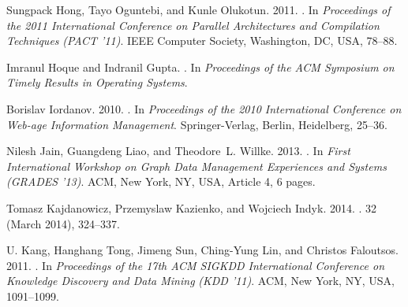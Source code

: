 \documentclass[reprint,twocolumn,showpacs,preprintnumbers,amsmath, aps,pre,amssymb]{revtex4-1}
\begin{document}
\begin{thebibliography}{00}
{
{Sungpack Hong}, {Tayo Oguntebi}, {and} {Kunle Olukotun}. 2011.
\newblock {}. In {\em Proceedings of the 2011 International Conference on
  Parallel Architectures and Compilation Techniques} {\em (PACT '11)}. IEEE
  Computer Society, Washington, DC, USA, 78--88.
\newblock
{}


{Imranul Hoque} {and} {Indranil Gupta}.
\newblock {}. In {\em Proceedings of the ACM Symposium on Timely Results in
  Operating Systems}.
\newblock


{Borislav Iordanov}. 2010.
\newblock {}.
\newblock In {\em Proceedings of the 2010 International Conference on Web-age
  Information Management}. Springer-Verlag, Berlin, Heidelberg, 25--36.
\newblock
{}


{Nilesh Jain}, {Guangdeng Liao}, {and} {Theodore~L. Willke}. 2013.
\newblock {}. In
  {\em First International Workshop on Graph Data Management Experiences and
  Systems} {\em (GRADES '13)}. ACM, New York, NY, USA, Article 4, 6 pages.
\newblock
{}


{Tomasz Kajdanowicz}, {Przemyslaw Kazienko}, {and} {Wojciech Indyk}. 2014.
\newblock {}.
  {32} (March 2014), 324--337.
\newblock
{}


{U. Kang}, {Hanghang Tong}, {Jimeng Sun}, {Ching-Yung Lin}, {and} {Christos
  Faloutsos}. 2011.
\newblock {}. In {\em Proceedings of the 17th ACM SIGKDD International Conference
  on Knowledge Discovery and Data Mining} {\em (KDD '11)}. ACM, New York, NY,
  USA, 1091--1099.
\newblock
{}


}
\end{thebibliography}
\end{document}
